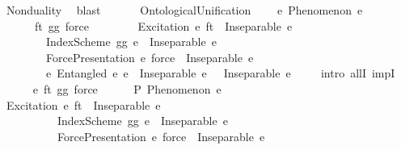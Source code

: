 \begin{isabellebody}
\ Nonduality\ \isamarkupfalse%
\ blast\isanewline
\ \ \isamarkupfalse%
%
\endisatagproof
{\isafoldproof}%
%
\isadelimproof
%
\endisadelimproof
%
\isadelimdocument
%
\endisadelimdocument
%
\isatagdocument
%
\isamarkuptrue%
%
\endisatagdocument
{\isafolddocument}%
%
\isadelimdocument
%
\endisadelimdocument
\ \ \isamarkupfalse%
\ Ontological{\isacharunderscore}{\kern0pt}Unification{\isacharcolon}{\kern0pt}\isanewline
\ \ \ \ {\isachardoublequoteopen}{\isasymforall}e{\isachardot}{\kern0pt}\ Phenomenon\ e\ {\isasymlongrightarrow}\isanewline
\ \ \ \ \ \ {\isacharparenleft}{\kern0pt}{\isasymforall}ft\ gg\ force{\isachardot}{\kern0pt}\isanewline
\ \ \ \ \ \ \ \ {\isacharparenleft}{\kern0pt}Excitation\ e\ ft\ {\isasymlongrightarrow}\ Inseparable\ e\ {\isasymOmega}{\isacharparenright}{\kern0pt}\ {\isasymand}\isanewline
\ \ \ \ \ \ \ \ {\isacharparenleft}{\kern0pt}IndexScheme\ gg\ e\ {\isasymlongrightarrow}\ Inseparable\ e\ {\isasymOmega}{\isacharparenright}{\kern0pt}\ {\isasymand}\isanewline
\ \ \ \ \ \ \ \ {\isacharparenleft}{\kern0pt}ForcePresentation\ e\ force\ {\isasymlongrightarrow}\ Inseparable\ e\ {\isasymOmega}{\isacharparenright}{\kern0pt}\ {\isasymand}\isanewline
\ \ \ \ \ \ \ \ {\isacharparenleft}{\kern0pt}{\isasymforall}e{}{\isachardot}{\kern0pt}\ Entangled\ e\ e{}\ {\isasymlongrightarrow}\ Inseparable\ e\ {\isasymOmega}\ {\isasymand}\ Inseparable\ e{}\ {\isasymOmega}{\isacharparenright}{\kern0pt}{\isacharparenright}{\kern0pt}{\isachardoublequoteclose}\isanewline
%
\isadelimproof
\ \ %
\endisadelimproof
%
\isatagproof
{}\isamarkupfalse%
\ {\isacharparenleft}{\kern0pt}intro\ allI\ impI{\isacharparenright}{\kern0pt}\isanewline
\ \ \ \ \isamarkupfalse%
\ e\ ft\ gg\ force\isanewline
\ \ \ \ \isamarkupfalse%
\ P{\isacharcolon}{\kern0pt}\ {\isachardoublequoteopen}Phenomenon\ e{\isachardoublequoteclose}\isanewline
\ \ \ \ \isamarkupfalse%
\ {\isachardoublequoteopen}{\isacharparenleft}{\kern0pt}Excitation\ e\ ft\ {\isasymlongrightarrow}\ Inseparable\ e\ {\isasymOmega}{\isacharparenright}{\kern0pt}\ {\isasymand}\isanewline
\ \ \ \ \ \ \ \ \ \ {\isacharparenleft}{\kern0pt}IndexScheme\ gg\ e\ {\isasymlongrightarrow}\ Inseparable\ e\ {\isasymOmega}{\isacharparenright}{\kern0pt}\ {\isasymand}\isanewline
\ \ \ \ \ \ \ \ \ \ {\isacharparenleft}{\kern0pt}ForcePresentation\ e\ force\ {\isasymlongrightarrow}\ Inseparable\ e\ {\isasymOmega}{\isacharparenright}{\kern0pt}\ {\isasymand}\isanewline

\end{isabellebody}
